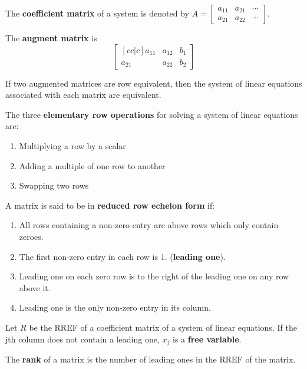 \documentclass[english, 12pt]{article}
\begin{document}
\begin{defn}
The \textbf{coefficient matrix} of a system is denoted by $A = \begin{bmatrix} a_{11}  & a_{21} & \cdots \\ a_{21} & a_{22} & \cdots \end{bmatrix}$.
\end{defn}
\begin{defn}
The \textbf{augment matrix} is 
\[
\begin{bmatrix}[cc|c]
  a_{11} & a_{12} & b_{1}\\
  a_{21} & a_{22} & b_{2}
\end{bmatrix}
\]
\end{defn}
\begin{thrm}
If two augmented matrices are row equivalent, then the system of linear equations associated with each matrix are equivalent.
\end{thrm}
\begin{mthd}
The three \textbf{elementary row operations} for solving a system of linear equations are:
\begin{enumerate}
\item Multiplying a row by a scalar
\item Adding a multiple of one row to another
\item Swapping two rows
\end{enumerate}
\end{mthd}
\begin{defn}
A matrix is said to be in \textbf{reduced row echelon form} if:
\begin{enumerate}
  \item All rows containing a non-zero entry are above rows which only contain zeroes.
  \item The first non-zero entry in each row is 1. (\textbf{leading one}).
  \item Leading one on each zero row is to the right of the leading one on any row above it.
  \item Leading one is the only non-zero entry in its column.
\end{enumerate}
\end{defn}

\begin{defn}
Let $R$ be the RREF of a coefficient matrix of a system of linear equations. If the jth column does not contain a leading one, $x_{j}$ is a \textbf{free variable}.
\end{defn}

\begin{defn}
The \textbf{rank} of a matrix is the number of leading ones in the RREF of the matrix.
\end{defn}
\end{document}
